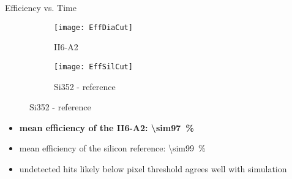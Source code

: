 \begin{frame}{Efficiency vs. Time}

	\vspace*{-10pt}
	\begin{figure} 
		\begin{center}
			\begin{subfigure}{0.48\textwidth}  
				\centering 
				\texttt{[image: EffDiaCut]}
				\caption{II6-A2} 	
			\end{subfigure}
			\begin{subfigure}{0.48\textwidth} 
				\centering 
				\texttt{[image: EffSilCut]}
				\caption{Si352 - reference} 	
			\end{subfigure} 
		\end{center}
	\end{figure}
	
	\begin{itemize}
		\itemfill
		\item {} \textbf{mean efficiency of the II6-A2: \SI{\sim97}{\%}}
		\item mean efficiency of the silicon reference: \SI{\sim99}{\%}
		\item undetected hits likely below pixel threshold \ra agrees well with simulation
	\end{itemize}

\end{frame}
